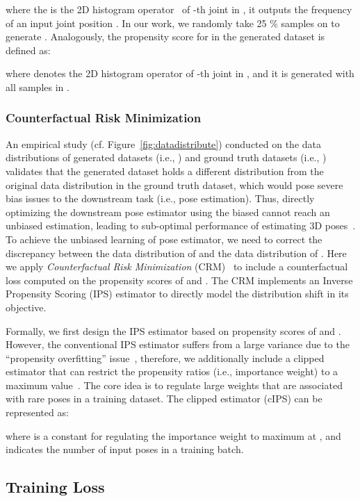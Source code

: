 \documentclass[runningheads]{llncs}
\begin{document}
where the  is the 2D histogram operator~\cite{2Dhistrogram} of -th joint in , it outputs the frequency of an input joint position . In our work, we randomly take 25 \% samples on  to generate . 
Analogously, the propensity score  for  in the generated dataset  is defined as:


where  denotes the 2D histogram operator of -th joint in , and it is generated with all samples in . 

\subsubsection{Counterfactual Risk Minimization} 
An empirical study (cf. Figure~\ref{fig:datadistribute}) conducted on the data distributions of generated datasets (i.e., ) and ground truth datasets (i.e., ) validates that the generated dataset holds a different distribution from the original data distribution in the ground truth dataset, which would pose severe bias issues to the downstream task (i.e., pose estimation).
Thus, directly optimizing the downstream pose estimator using the biased  cannot reach an unbiased estimation, leading to sub-optimal performance of estimating 3D poses~\cite{crmcv1}.
To achieve the unbiased learning of pose estimator, we need to correct the discrepancy between the data distribution of  and the data distribution of . 
Here we apply \textit{Counterfactual Risk Minimization} (CRM)~\cite{crmdebias1,CRMfairness} to include a counterfactual loss  computed on the propensity scores of  and .
The CRM implements an Inverse Propensity Scoring (IPS) estimator to directly model the distribution shift in its objective.

Formally, we first design the IPS estimator based on propensity scores of  and . 
However, the conventional IPS estimator suffers from a large variance due to the ``propensity overfitting'' issue~\cite{CRMfairness,CRMfairness2,Correctmismatch}, therefore,
we additionally include a clipped estimator that can restrict the propensity ratios (i.e., importance weight) to a maximum value~\cite{bottou2013counterfactual}. 
The core idea is to regulate large weights that are associated with rare poses in a training dataset. The clipped estimator (cIPS) can be represented as:


where  is a constant for regulating the importance weight  to maximum at , and  indicates the number of input poses  in a training batch. 

\subsection{Training Loss}
\end{document}
